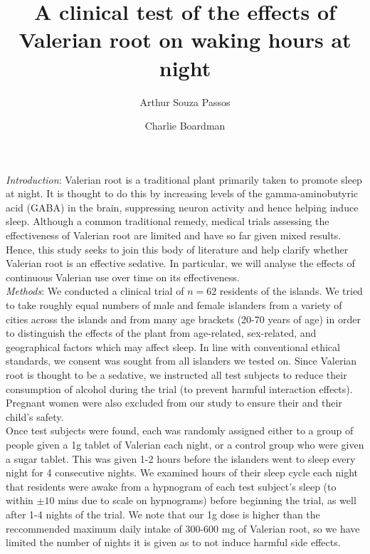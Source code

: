 \documentclass[10pt,preprintnumbers,amsmath,amssymb,floatfix,twocolumn,prl]{revtex4-2}
\begin{document}
\title{A clinical test of the effects of Valerian root on waking hours at night}
\author{Arthur Souza Passos}
\author{Charlie Boardman}

\maketitle

\textit{Introduction}: Valerian root is a traditional plant primarily taken to promote sleep at night. It is thought to do this by increasing levels of the gamma-aminobutyric acid (GABA) in the brain, suppressing neuron activity and hence helping induce sleep. Although a common traditional remedy, medical trials assessing the effectiveness of Valerian root are limited and have so far given mixed results. Hence, this study seeks to join this body of literature and help clarify whether Valerian root is an effective sedative. In particular, we will analyse the effects of continuous Valerian use over time on its effectiveness. \\

\textit{Methods}: 
We conducted a clinical trial of $n=62$ residents of the islands. We tried to take roughly equal numbers of male and female islanders from a variety of cities across the islands and from many age brackets (20-70 years of age) in order to distinguish the effects of the plant from age-related, sex-related, and geographical factors which may affect sleep. In line with conventional ethical standards, we consent was sought from all islanders we tested on. Since Valerian root is thought to be a sedative, we instructed all test subjects to reduce their consumption of alcohol during the trial (to prevent harmful interaction effects). Pregnant women were also excluded from our study to ensure their and their child’s safety. \\

Once test subjects were found, each was randomly assigned either to a group of people given a 1g tablet of Valerian each night, or a control group who were given a sugar tablet. This was given 1-2 hours before the islanders went to sleep every night for 4 consecutive nights. We examined hours of their sleep cycle each night that residents were awake from a hypnogram of each test subject’s sleep (to within $\pm10$ mins due to scale on hypnograms) before beginning the trial, as well after 1-4 nights of the trial. We note that our 1g  dose is higher than the reccommended maximum daily intake of 300-600 mg of Valerian root, so we have limited the number of nights it is given as to not induce harmful side effects. \\
\end{document}
